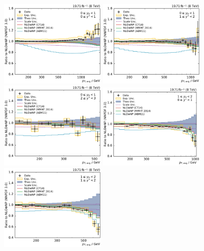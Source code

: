 \begin{figure}[htbp]
    \centering
    \includegraphics[width=0.45\textwidth]{figures/measurement/ratio_to_NNPDF30+np_totcomp_yb0ys0.pdf}\hfill
    \includegraphics[width=0.45\textwidth]{figures/measurement/ratio_to_NNPDF30+np_totcomp_yb0ys1.pdf}
    \includegraphics[width=0.45\textwidth]{figures/measurement/ratio_to_NNPDF30+np_totcomp_yb0ys2.pdf}\hfill
    \includegraphics[width=0.45\textwidth]{figures/measurement/ratio_to_NNPDF30+np_totcomp_yb1ys0.pdf}
    \includegraphics[width=0.45\textwidth]{figures/measurement/ratio_to_NNPDF30+np_totcomp_yb1ys1.pdf}\hfill

\end{figure}
